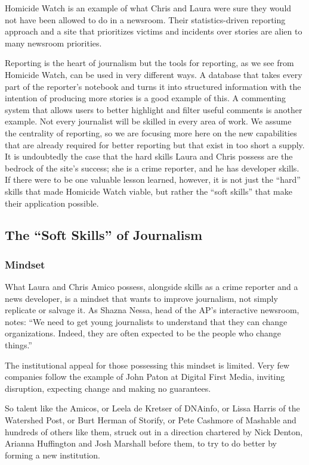 Homicide Watch is an example of what Chris and Laura were sure they would
not have been allowed to do in a newsroom. Their statistics-driven reporting
approach and a site that prioritizes victims and incidents over stories are alien to
many newsroom priorities.

Reporting is the heart of journalism but the tools for reporting, as we see from
Homicide Watch, can be used in very different ways. A database that takes every
part of the reporter’s notebook and turns it into structured information with the
intention of producing more stories is a good example of this. A commenting
system that allows users to better highlight and filter useful comments is another
example. Not every journalist will be skilled in every area of work. We assume
the centrality of reporting, so we are focusing more here on the new capabilities
that are already required for better reporting but that exist in too short a supply.
It is undoubtedly the case that the hard skills Laura and Chris possess are the
bedrock of the site’s success; she is a crime reporter, and he has developer skills.
If there were to be one valuable lesson learned, however, it is not just the ``hard''
skills that made Homicide Watch viable, but rather the ``soft skills'' that make
their application possible.

\subsection{The ``Soft Skills'' of Journalism}
\subsubsection{Mindset}
What Laura and Chris Amico possess, alongside skills as a crime reporter and a
news developer, is a mindset that wants to improve journalism, not simply replicate
or salvage it. As Shazna Nessa, head of the AP’s interactive newsroom, notes:
``We need to get young journalists to understand that they can change organizations.
Indeed, they are often expected to be the people who change things.''

The institutional appeal for those possessing this mindset is limited. Very few
companies follow the example of John Paton at Digital First Media, inviting
disruption, expecting change and making no guarantees.

So talent like the Amicos, or Leela de Kretser of DNAinfo, or Lissa Harris of
the Watershed Post, or Burt Herman of Storify, or Pete Cashmore of Mashable
and hundreds of others like them, struck out in a direction chartered by Nick
Denton, Arianna Huffington and Josh Marshall before them, to try to do better
by forming a new institution.

